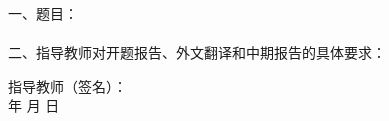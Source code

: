 
\newpage
\thispagestyle{empty}

\begin{tabbing}
\hspace{5mm}\songti\sihao 一、题目：\underline{}
\\ \\
\hspace{5mm}\songti\sihao 二、指导教师对开题报告、外文翻译和中期报告的具体要求：
\end{tabbing}

\vspace{140mm}

\begin{tabbing}
\hspace{80mm}\songti\xiaosi 指导教师（签名）：
\\ \hspace{90mm} \songti\xiaosi 年 \hspace{5mm} \songti\xiaosi 月 \hspace{5mm} \songti\xiaosi 日
\end{tabbing}

